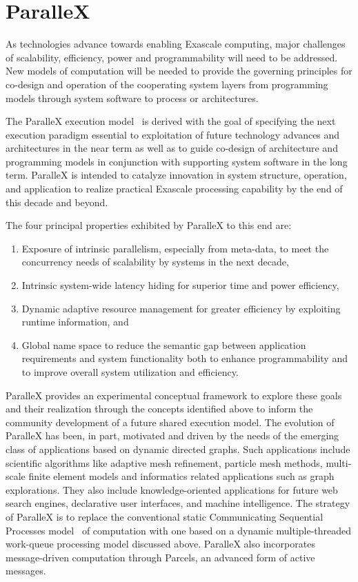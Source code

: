\documentclass[floatfix]{revtex4}
\begin{document}
\section{ParalleX}
\label{sec_parallex}
As technologies advance towards enabling Exascale computing, major challenges
of scalability, efficiency, power and programmability will need to be addressed.
New models of computation will be needed to provide the governing principles
for co-design and operation of the cooperating system layers from programming
models through system software to process or architectures.

The ParalleX execution model~\cite{scaling_impaired_apps,tabbal} 
is derived with the goal of specifying
the next execution paradigm essential to exploitation of future
technology advances and architectures in the near term as well as
to guide co-design of architecture and programming models in
conjunction with supporting system software in the long term.
ParalleX is intended to catalyze innovation in system structure, operation,
and application to realize practical Exascale processing capability by
the end of this decade and beyond.

The four principal properties exhibited by ParalleX to this end are:
\begin{enumerate}
\item Exposure of intrinsic parallelism, especially from meta-data, 
to meet the concurrency needs of scalability by systems in the next decade,
\item Intrinsic system-wide latency hiding for superior time and power efficiency,
\item Dynamic adaptive resource management for greater efficiency by exploiting runtime information, and
\item Global name space to reduce the semantic gap between application requirements and system functionality both to enhance programmability and to improve overall system utilization and efficiency.
\end{enumerate}

ParalleX provides an experimental conceptual framework to explore these goals and
their realization through the concepts identified above to inform the
community development of a future shared execution model. The evolution
of ParalleX has been, in part, motivated and driven by the needs of the
emerging class of applications based on dynamic directed graphs. Such
applications include scientific algorithms like adaptive mesh refinement,
particle mesh methods, multi-scale finite element models and informatics related applications
such as graph explorations. They also
include knowledge-oriented applications for future web search engines,
declarative user interfaces, and machine intelligence. The strategy of
ParalleX is to replace the conventional static Communicating Sequential
Processes model~\cite{csp} of computation with one based on a dynamic
multiple-threaded work-queue processing model discussed above. ParalleX
also incorporates message-driven computation through Parcels, an advanced
form of active messages.
\end{document}
